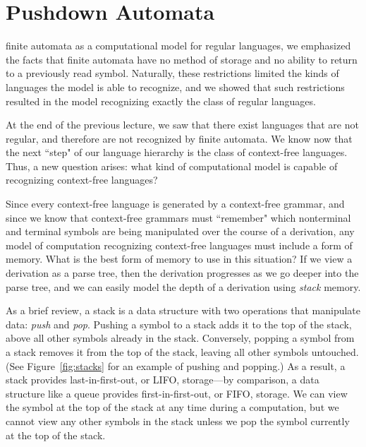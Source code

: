 \section{Pushdown Automata}\label{sec:pushdownautomata}

 finite automata as a computational model for regular languages, we emphasized the facts that finite automata have no method of storage and no ability to return to a previously read symbol. Naturally, these restrictions limited the kinds of languages the model is able to recognize, and we showed that such restrictions resulted in the model recognizing exactly the class of regular languages.

At the end of the previous lecture, we saw that there exist languages that are not regular, and therefore are not recognized by finite automata. We know now that the next ``step" of our language hierarchy is the class of context-free languages. Thus, a new question arises: what kind of computational model is capable of recognizing context-free languages?

Since every context-free language is generated by a context-free grammar, and since we know that context-free grammars must ``remember" which nonterminal and terminal symbols are being manipulated over the course of a derivation, any model of computation recognizing context-free languages must include a form of memory. What is the best form of memory to use in this situation? If we view a derivation as a parse tree, then the derivation progresses as we go deeper into the parse tree, and we can easily model the depth of a derivation using \emph{stack} memory.

As a brief review, a stack is a data structure with two operations that manipulate data: \emph{push} and \emph{pop}. Pushing a symbol to a stack adds it to the top of the stack, above all other symbols already in the stack. Conversely, popping a symbol from a stack removes it from the top of the stack, leaving all other symbols untouched. (See Figure~\ref{fig:stacks} for an example of pushing and popping.) As a result, a stack provides last-in-first-out, or LIFO, storage---by comparison, a data structure like a queue provides first-in-first-out, or FIFO, storage. We can view the symbol at the top of the stack at any time during a computation, but we cannot view any other symbols in the stack unless we pop the symbol currently at the top of the stack.

